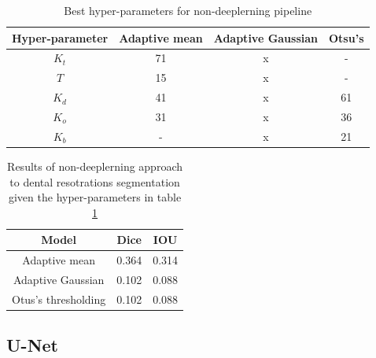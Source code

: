 \begin{table}[H]
    \begin{tabular}{|c|c|c|c|}
        \hline
        Hyper-parameter & Adaptive mean & Adaptive Gaussian & Otsu's \\ \hline
        $K_t$           & 71            & x                 & -      \\ \hline
        $T$             & 15            & x                 & -      \\ \hline
        $K_d$           & 41            & x                 & 61     \\ \hline
        $K_o$           & 31            & x                 & 36     \\ \hline
        $K_b$           & -             & x                 & 21     \\ \hline
    \end{tabular}
    \caption{Best hyper-parameters for non-deeplerning pipeline}
    \label{tab:nondl_restorations:best_params}
\end{table}


\begin{table}[H]
    \centering
    \begin{tabular}{|c|c|c|}
        \hline
        Model               & Dice  & IOU   \\ \hline
        Adaptive mean       & 0.364 & 0.314 \\ \hline
        Adaptive Gaussian   & 0.102 & 0.088 \\ \hline
        Otus's thresholding & 0.102 & 0.088 \\ \hline
    \end{tabular}
    \caption{Results of non-deeplerning approach to dental resotrations segmentation given the hyper-parameters in table \ref{tab:nondl_restorations:best_params}}
    \label{tab:nondl_results}
\end{table}



\subsection{U-Net}

